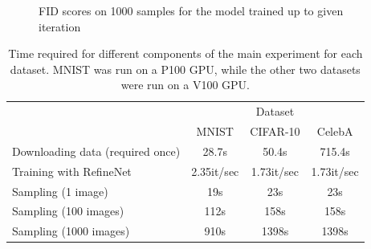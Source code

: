 \vspace{0.8cm}

\begin{figure}[h!]
    \centering
    \caption{FID scores on 1000 samples for the model trained up to given iteration}
    \label{fig:fid}
\end{figure}

\vspace{1cm}

\begin{table}[h!]
    \centering
    \begin{tabular}{l c c c}
    \toprule
         & \multicolumn{3}{c}{Dataset} \\ \cmidrule{2-4}
         & MNIST & CIFAR-10 & CelebA \\ \midrule     
    Downloading data (required once) & 28.7s & 50.4s & 715.4s \\
    Training with RefineNet & 2.35it/sec & 1.73it/sec & 1.73it/sec \\
    Sampling (1 image) & 19s & 23s & 23s \\
    Sampling (100 images) & 112s & 158s & 158s \\
    Sampling (1000 images) & 910s & 1398s & 1398s \\ \bottomrule
    \end{tabular}
    \vspace{3mm}
    \caption{Time required for different components of the main experiment for each dataset. MNIST was run on a P100 GPU, while the other two datasets were run on a V100 GPU.}
    \label{tab:times}
\end{table}


